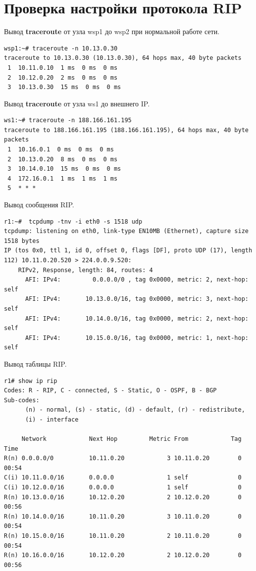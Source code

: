 \documentclass[a4paper,12pt]{article}
\begin{document}
\section{Проверка настройки протокола RIP}

Вывод \textbf{traceroute} от узла wsp1 до wsp2 при нормальной работе сети.

\begin{Verbatim}
wsp1:~# traceroute -n 10.13.0.30
traceroute to 10.13.0.30 (10.13.0.30), 64 hops max, 40 byte packets
 1  10.11.0.10  1 ms  0 ms  0 ms
 2  10.12.0.20  2 ms  0 ms  0 ms
 3  10.13.0.30  15 ms  0 ms  0 ms
\end{Verbatim}

Вывод \textbf{traceroute} от узла ws1 до внешнего IP.

\begin{Verbatim}
ws1:~# traceroute -n 188.166.161.195
traceroute to 188.166.161.195 (188.166.161.195), 64 hops max, 40 byte packets
 1  10.16.0.1  0 ms  0 ms  0 ms
 2  10.13.0.20  8 ms  0 ms  0 ms
 3  10.14.0.10  15 ms  0 ms  0 ms
 4  172.16.0.1  1 ms  1 ms  1 ms
 5  * * *
\end{Verbatim}

Вывод сообщения RIP.

\begin{Verbatim}
r1:~#  tcpdump -tnv -i eth0 -s 1518 udp
tcpdump: listening on eth0, link-type EN10MB (Ethernet), capture size 1518 bytes
IP (tos 0x0, ttl 1, id 0, offset 0, flags [DF], proto UDP (17), length 112) 10.11.0.20.520 > 224.0.0.9.520: 
	RIPv2, Response, length: 84, routes: 4
	  AFI: IPv4:         0.0.0.0/0 , tag 0x0000, metric: 2, next-hop: self
	  AFI: IPv4:       10.13.0.0/16, tag 0x0000, metric: 3, next-hop: self
	  AFI: IPv4:       10.14.0.0/16, tag 0x0000, metric: 2, next-hop: self
	  AFI: IPv4:       10.15.0.0/16, tag 0x0000, metric: 1, next-hop: self
\end{Verbatim}

Вывод таблицы RIP.

\begin{Verbatim}
r1# show ip rip
Codes: R - RIP, C - connected, S - Static, O - OSPF, B - BGP
Sub-codes:
      (n) - normal, (s) - static, (d) - default, (r) - redistribute,
      (i) - interface

     Network            Next Hop         Metric From            Tag Time
R(n) 0.0.0.0/0          10.11.0.20            3 10.11.0.20        0 00:54
C(i) 10.11.0.0/16       0.0.0.0               1 self              0
C(i) 10.12.0.0/16       0.0.0.0               1 self              0
R(n) 10.13.0.0/16       10.12.0.20            2 10.12.0.20        0 00:56
R(n) 10.14.0.0/16       10.11.0.20            3 10.11.0.20        0 00:54
R(n) 10.15.0.0/16       10.11.0.20            2 10.11.0.20        0 00:54
R(n) 10.16.0.0/16       10.12.0.20            2 10.12.0.20        0 00:56
\end{Verbatim}
\end{document}
